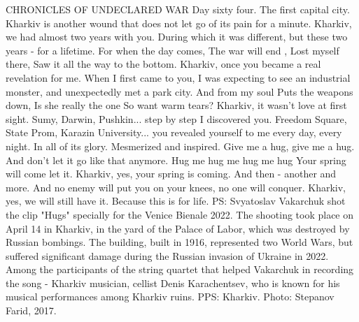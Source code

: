  
 
 
 
 

CHRONICLES OF UNDECLARED WAR
Day sixty four. The first capital city.
Kharkiv is another wound that does not let go of its pain for a minute.
Kharkiv, we had almost two years with you. During which it was different, but these two years - for a lifetime.
For when the day comes,
The war will end ,
Lost myself there,
Saw it all the way to the bottom.
Kharkiv, once you became a real revelation for me. When I first came to you, I was expecting to see an industrial monster, and unexpectedly met a park city.
And from my soul
Puts the weapons down,
Is she really the one
So want warm tears?
Kharkiv, it wasn't love at first sight. Sumy, Darwin, Pushkin... step by step I discovered you. Freedom Square, State Prom, Karazin University... you revealed yourself to me every day, every night. In all of its glory. Mesmerized and inspired.
Give me a hug, give me a hug.
And don't let it go like that anymore.
Hug me hug me hug me hug
Your spring will come let it.
Kharkiv, yes, your spring is coming. And then - another and more. And no enemy will put you on your knees, no one will conquer.
Kharkiv, yes, we will still have it. Because this is for life.
PS:
Svyatoslav Vakarchuk shot the clip "Hugs" specially for the Venice Bienale 2022.
The shooting took place on April 14 in Kharkiv, in the yard of the Palace of Labor, which was destroyed by Russian bombings. The building, built in 1916, represented two World Wars, but suffered significant damage during the Russian invasion of Ukraine in 2022.
Among the participants of the string quartet that helped Vakarchuk in recording the song - Kharkiv musician, cellist Denis Karachentsev, who is known for his musical performances among Kharkiv ruins.
PPS:
Kharkiv.
Photo: Stepanov Farid, 2017.
